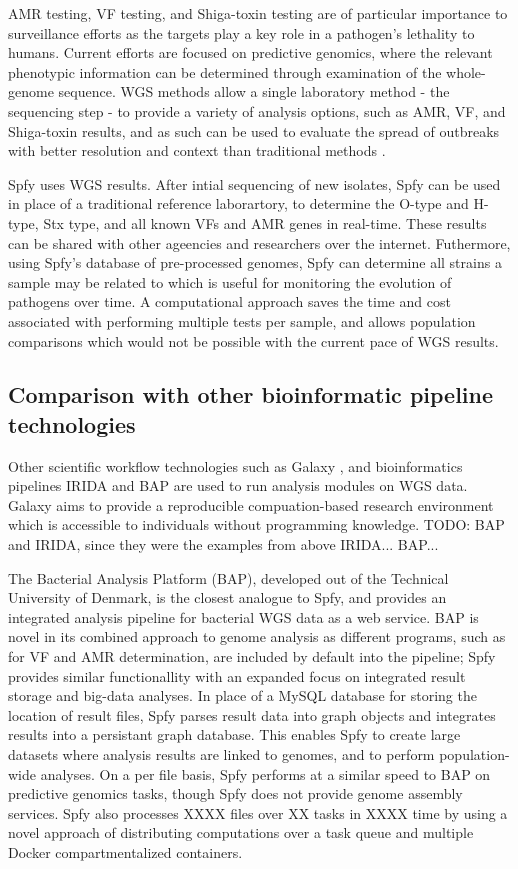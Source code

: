 \documentclass[a4,center,fleqn]{NAR}
\begin{document}
AMR testing, VF testing, and Shiga-toxin testing are of particular importance to surveillance efforts as the targets play a key role in a pathogen's lethality to humans.
Current efforts are focused on predictive genomics, where the relevant phenotypic information can be determined through examination of the whole-genome sequence.
WGS methods allow a single laboratory method - the sequencing step - to provide a variety of analysis options, such as AMR, VF, and Shiga-toxin results, and as such can be used to evaluate the spread of outbreaks with better resolution and context than traditional methods \cite{ronholm2016navigating}.

Spfy uses WGS results.
After intial sequencing of new isolates, Spfy can be used in place of a traditional reference laborartory, to determine the O-type and H-type, Stx type, and all known VFs and AMR genes in real-time.
These results can be shared with other ageencies and researchers over the internet.
Futhermore, using Spfy's database of pre-processed genomes, Spfy can determine all strains a sample may be related to which is useful for monitoring the evolution of pathogens over time.
A computational approach saves the time and cost associated with performing multiple tests per sample, and allows population comparisons which would not be possible with the current pace of WGS results.

\subsection{Comparison with other bioinformatic pipeline technologies}

Other scientific workflow technologies such as Galaxy \cite{goecks2010galaxy}, and bioinformatics pipelines IRIDA and BAP are used to run analysis modules on WGS data.
Galaxy aims to provide a reproducible compuation-based research environment which is accessible to individuals without programming knowledge.
TODO: BAP and IRIDA, since they were the examples from above
IRIDA...
BAP...

The Bacterial Analysis Platform (BAP), developed out of the Technical University of Denmark, is the closest analogue to Spfy, and provides an integrated analysis pipeline for bacterial WGS data as a web service.
BAP is novel in its combined approach to genome analysis as different programs, such as for VF and AMR determination, are included by default into the pipeline; Spfy provides similar functionallity with an expanded focus on integrated result storage and big-data analyses.
In place of a MySQL database for storing the location of result files, Spfy parses result data into graph objects and integrates results into a persistant graph database.
This enables Spfy to create large datasets where analysis results are linked to genomes, and to perform population-wide analyses.
On a per file basis, Spfy performs at a similar speed to BAP on predictive genomics tasks, though Spfy does not provide genome assembly services.
Spfy also processes XXXX files over XX tasks in XXXX time by using a novel approach of distributing computations over a task queue and multiple Docker compartmentalized containers.
\end{document}
